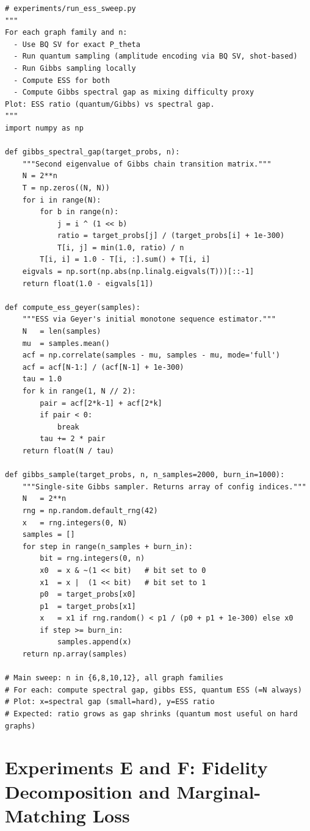 \documentclass[11pt]{article}
\begin{document}
\begin{lstlisting}
# experiments/run_ess_sweep.py
"""
For each graph family and n:
  - Use BQ SV for exact P_theta
  - Run quantum sampling (amplitude encoding via BQ SV, shot-based)
  - Run Gibbs sampling locally
  - Compute ESS for both
  - Compute Gibbs spectral gap as mixing difficulty proxy
Plot: ESS ratio (quantum/Gibbs) vs spectral gap.
"""
import numpy as np

def gibbs_spectral_gap(target_probs, n):
    """Second eigenvalue of Gibbs chain transition matrix."""
    N = 2**n
    T = np.zeros((N, N))
    for i in range(N):
        for b in range(n):
            j = i ^ (1 << b)
            ratio = target_probs[j] / (target_probs[i] + 1e-300)
            T[i, j] = min(1.0, ratio) / n
        T[i, i] = 1.0 - T[i, :].sum() + T[i, i]
    eigvals = np.sort(np.abs(np.linalg.eigvals(T)))[::-1]
    return float(1.0 - eigvals[1])

def compute_ess_geyer(samples):
    """ESS via Geyer's initial monotone sequence estimator."""
    N   = len(samples)
    mu  = samples.mean()
    acf = np.correlate(samples - mu, samples - mu, mode='full')
    acf = acf[N-1:] / (acf[N-1] + 1e-300)
    tau = 1.0
    for k in range(1, N // 2):
        pair = acf[2*k-1] + acf[2*k]
        if pair < 0:
            break
        tau += 2 * pair
    return float(N / tau)

def gibbs_sample(target_probs, n, n_samples=2000, burn_in=1000):
    """Single-site Gibbs sampler. Returns array of config indices."""
    N   = 2**n
    rng = np.random.default_rng(42)
    x   = rng.integers(0, N)
    samples = []
    for step in range(n_samples + burn_in):
        bit = rng.integers(0, n)
        x0  = x & ~(1 << bit)   # bit set to 0
        x1  = x |  (1 << bit)   # bit set to 1
        p0  = target_probs[x0]
        p1  = target_probs[x1]
        x   = x1 if rng.random() < p1 / (p0 + p1 + 1e-300) else x0
        if step >= burn_in:
            samples.append(x)
    return np.array(samples)

# Main sweep: n in {6,8,10,12}, all graph families
# For each: compute spectral gap, gibbs ESS, quantum ESS (=N always)
# Plot: x=spectral gap (small=hard), y=ESS ratio
# Expected: ratio grows as gap shrinks (quantum most useful on hard graphs)
\end{lstlisting}

\section{Experiments E and F: Fidelity Decomposition
         and Marginal-Matching Loss}
\end{document}
